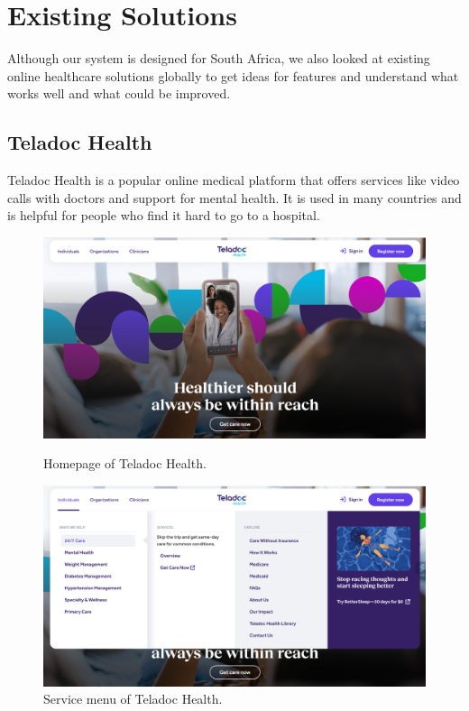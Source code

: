 \section{Existing Solutions}
\label{sec:existing-solutions}

Although our system is designed for South Africa, we also looked at existing online healthcare solutions globally to get ideas for features and understand what works well and what could be improved.

\subsection{Teladoc Health}
Teladoc Health is a popular online medical platform \cite{teladocwebsite} that offers services like video calls with doctors and support for mental health. It is used in many countries and is helpful for people who find it hard to go to a hospital. 

\begin{figure}[htbp]
    \centering
    \begin{minipage}[b]{0.47\textwidth}
        \centering
        \includegraphics[width=\textwidth]{../../images/telodocHome.png}
        \caption{Homepage of Teladoc Health.}
        \label{fig:teladoc-home}
    \end{minipage}
    \hfill
    \begin{minipage}[b]{0.47\textwidth}
        \centering
        \includegraphics[width=\textwidth]{../../images/telodocServices.png}
        \caption{Service menu of Teladoc Health.}
        \label{fig:teladoc-services}
    \end{minipage}
\end{figure}

